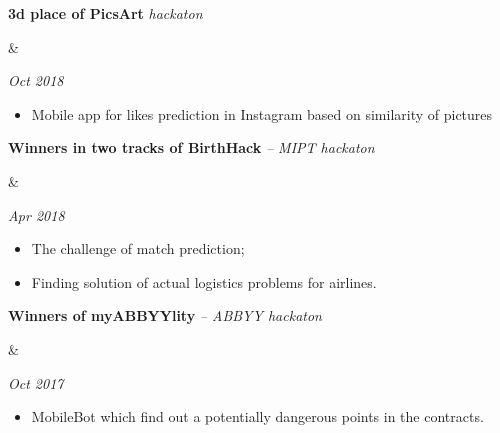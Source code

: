 \documentclass[11pt,a4paper,roman]{moderncv}
\newcommand*{\cvhack}[3]{
    \parbox[t]{0.78\textwidth}{
    {\bfseries #2} {\itshape #3}
    }&\parbox[t]{0.22\textwidth}{
    \hfill {\itshape #1}}
}
\begin{document}
{\cvhack{Oct 2018}
        {3d place of PicsArt}
        {hackaton}
{\begin{itemize}
  \item Mobile app for likes prediction in Instagram based on similarity of pictures
\end{itemize}}}

{\cvhack{Apr 2018}
        {Winners in two tracks of BirthHack}
        {-- MIPT hackaton}
{\begin{itemize}
  \item The challenge of match prediction;
  \item Finding solution of actual logistics problems for airlines.
\end{itemize}}}

{\cvhack{Oct 2017}
        {Winners of myABBYYlity}
        {-- ABBYY hackaton}
{\begin{itemize}
  \item MobileBot which find out a potentially dangerous points in the contracts.
\end{itemize}}}


      

% 
% 
\end{document}

